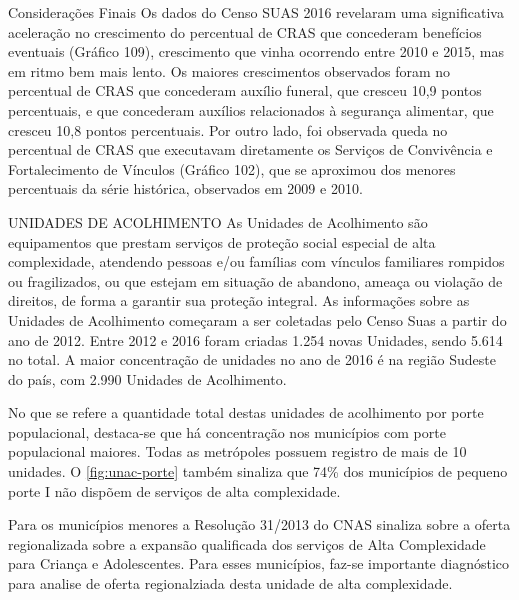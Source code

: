 \documentclass[
  brazilian]{report}
\begin{document}
Considerações Finais Os dados do Censo SUAS 2016 revelaram uma
significativa aceleração no crescimento do percentual de CRAS que
concederam benefícios eventuais (Gráfico 109), crescimento que vinha
ocorrendo entre 2010 e 2015, mas em ritmo bem mais lento. Os maiores
crescimentos observados foram no percentual de CRAS que concederam
auxílio funeral, que cresceu 10,9 pontos percentuais, e que concederam
auxílios relacionados à segurança alimentar, que cresceu 10,8 pontos
percentuais. Por outro lado, foi observada queda no percentual de CRAS
que executavam diretamente os Serviços de Convivência e Fortalecimento
de Vínculos (Gráfico 102), que se aproximou dos menores percentuais da
série histórica, observados em 2009 e 2010.

UNIDADES DE ACOLHIMENTO As Unidades de Acolhimento são equipamentos que
prestam serviços de proteção social especial de alta complexidade,
atendendo pessoas e/ou famílias com vínculos familiares rompidos ou
fragilizados, ou que estejam em situação de abandono, ameaça ou violação
de direitos, de forma a garantir sua proteção integral. As informações
sobre as Unidades de Acolhimento começaram a ser coletadas pelo Censo
Suas a partir do ano de 2012. Entre 2012 e 2016 foram criadas 1.254
novas Unidades, sendo 5.614 no total. A maior concentração de unidades
no ano de 2016 é na região Sudeste do país, com 2.990 Unidades de
Acolhimento.

No que se refere a quantidade total destas unidades de acolhimento por
porte populacional, destaca-se que há concentração nos municípios com
porte populacional maiores. Todas as metrópoles possuem registro de mais
de 10 unidades. O \cref{fig:unac-porte} também sinaliza que 74\% dos
municípios de pequeno porte I não dispõem de serviços de alta
complexidade.

Para os municípios menores a Resolução 31/2013 do CNAS sinaliza sobre a
oferta regionalizada sobre a expansão qualificada dos serviços de Alta
Complexidade para Criança e Adolescentes. Para esses municípios, faz-se
importante diagnóstico para analise de oferta regionalziada desta
unidade de alta complexidade.
\end{document}
